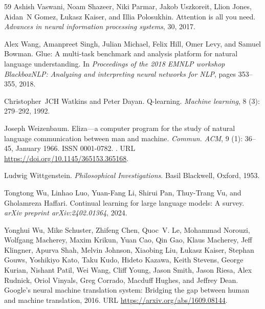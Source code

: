 \begin{thebibliography}{59}
Ashish Vaswani, Noam Shazeer, Niki Parmar, Jakob Uszkoreit, Llion Jones, Aidan~N Gomez, {\L}ukasz Kaiser, and Illia Polosukhin.
\newblock Attention is all you need.
\newblock \emph{Advances in neural information processing systems}, 30, 2017.

Alex Wang, Amanpreet Singh, Julian Michael, Felix Hill, Omer Levy, and Samuel Bowman.
\newblock Glue: A multi-task benchmark and analysis platform for natural language understanding.
\newblock In \emph{Proceedings of the 2018 EMNLP workshop BlackboxNLP: Analyzing and interpreting neural networks for NLP}, pages 353--355, 2018.

Christopher~JCH Watkins and Peter Dayan.
\newblock Q-learning.
\newblock \emph{Machine learning}, 8 (3): 279--292, 1992.

Joseph Weizenbaum.
\newblock Eliza—a computer program for the study of natural language communication between man and machine.
\newblock \emph{Commun. ACM}, 9 (1): 36–45, January 1966.
\newblock ISSN 0001-0782.
\newblock {}.
\newblock URL \url{https://doi.org/10.1145/365153.365168}.

Ludwig Wittgenstein.
\newblock \emph{Philosophical Investigations}.
\newblock Basil Blackwell, Oxford, 1953.

Tongtong Wu, Linhao Luo, Yuan-Fang Li, Shirui Pan, Thuy-Trang Vu, and Gholamreza Haffari.
\newblock Continual learning for large language models: A survey.
\newblock \emph{arXiv preprint arXiv:2402.01364}, 2024.

Yonghui Wu, Mike Schuster, Zhifeng Chen, Quoc~V. Le, Mohammad Norouzi, Wolfgang Macherey, Maxim Krikun, Yuan Cao, Qin Gao, Klaus Macherey, Jeff Klingner, Apurva Shah, Melvin Johnson, Xiaobing Liu, Łukasz Kaiser, Stephan Gouws, Yoshikiyo Kato, Taku Kudo, Hideto Kazawa, Keith Stevens, George Kurian, Nishant Patil, Wei Wang, Cliff Young, Jason Smith, Jason Riesa, Alex Rudnick, Oriol Vinyals, Greg Corrado, Macduff Hughes, and Jeffrey Dean.
\newblock Google's neural machine translation system: Bridging the gap between human and machine translation, 2016.
\newblock URL \url{https://arxiv.org/abs/1609.08144}.


\end{thebibliography}
